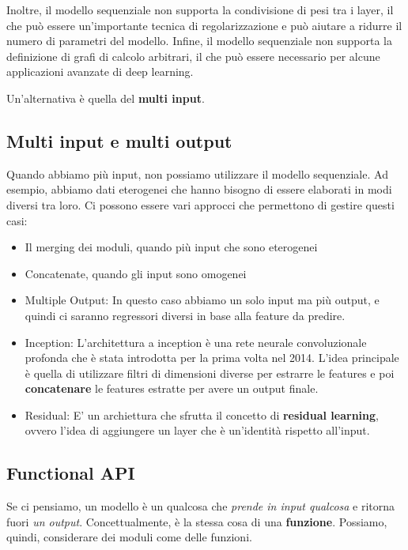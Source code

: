 Inoltre, il modello sequenziale non supporta la condivisione di pesi tra i
layer, il che può essere un'importante tecnica di regolarizzazione e può
aiutare a ridurre il numero di parametri del modello. Infine, il modello
sequenziale non supporta la definizione di grafi di calcolo arbitrari, il che
può essere necessario per alcune applicazioni avanzate di deep learning.

Un'alternativa è quella del \textbf{multi input}.

\subsection{Multi input e multi output}

Quando abbiamo più input, non possiamo utilizzare il modello sequenziale. Ad
esempio, abbiamo dati eterogenei che hanno bisogno di essere elaborati in modi
diversi tra loro. Ci possono essere vari approcci che permettono di gestire
questi casi:

\begin{itemize}
    \item Il merging dei moduli, quando più input che sono eterogenei
    \item Concatenate, quando gli input sono omogenei
    \item Multiple Output: In questo caso abbiamo un solo input ma più output, e quindi
          ci saranno regressori diversi in base alla feature da predire.
    \item Inception: L'architettura a inception è una rete neurale convoluzionale
          profonda che è stata introdotta per la prima volta nel 2014. L'idea principale
          è quella di utilizzare filtri di dimensioni diverse per estrarre le features e
          poi \textbf{concatenare} le features estratte per avere un output finale.
    \item Residual: E' un archiettura che sfrutta il concetto di \textbf{residual
              learning}, ovvero l'idea di aggiungere un layer che è un'identità rispetto
          all'input.
\end{itemize}

\subsection{Functional API}

Se ci pensiamo, un modello è un qualcosa che \textit{prende in input qualcosa}
e ritorna fuori \textit{un output}. Concettualmente, è la stessa cosa di una
\textbf{funzione}. Possiamo, quindi, considerare dei moduli come delle
funzioni.

